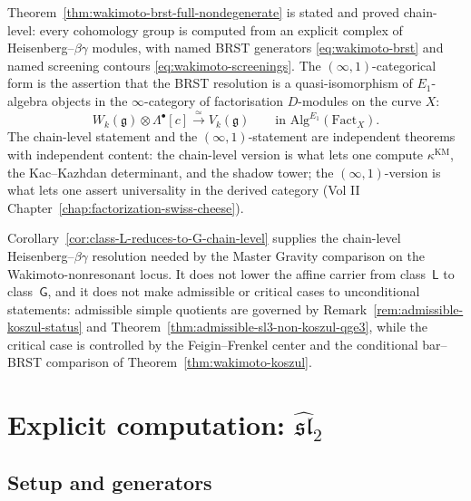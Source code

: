 \begin{remark}
\label{rem:wakimoto-brst-infty-lane}
Theorem~\ref{thm:wakimoto-brst-full-nondegenerate} is stated and
proved chain-level: every cohomology group is computed from an
explicit complex of Heisenberg--$\beta\gamma$ modules, with named
BRST generators
\eqref{eq:wakimoto-brst} and named screening contours
\eqref{eq:wakimoto-screenings}. The $(\infty,1)$-categorical
form is the assertion that the BRST resolution is a
quasi-isomorphism of $E_1$-algebra objects in the
$\infty$-category of factorisation $D$-modules on the curve $X$:
\[
W_k(\mathfrak{g})\otimes\Lambda^\bullet[c]
\xrightarrow{\;\simeq\;}
V_k(\mathfrak{g})
\qquad \text{in } \mathrm{Alg}^{E_1}(\mathrm{Fact}_X).
\]
The chain-level statement and the $(\infty,1)$-statement are
independent theorems with independent content: the chain-level
version is what lets one compute $\kappa^{\mathrm{KM}}$, the
Kac--Kazhdan determinant, and the shadow tower; the
$(\infty,1)$-version is what lets one assert universality in
the derived category (Vol II Chapter~\ref{chap:factorization-swiss-cheese}).
\end{remark}

\begin{remark}
\label{rem:wakimoto-brst-gravity-upgrade}
Corollary~\ref{cor:class-L-reduces-to-G-chain-level} supplies the
chain-level Heisenberg--$\beta\gamma$ resolution needed by the Master
Gravity comparison on the Wakimoto-nonresonant locus. It does not
lower the affine carrier from class~\(\mathsf L\) to
class~\(\mathsf G\), and it does not make admissible or critical
cases to unconditional statements:
admissible simple quotients are governed by
Remark~\ref{rem:admissible-koszul-status} and
Theorem~\ref{thm:admissible-sl3-non-koszul-qge3}, while the critical
case is controlled by the Feigin--Frenkel center and the conditional
bar--BRST comparison of Theorem~\ref{thm:wakimoto-koszul}.
\end{remark}

\section{\texorpdfstring{Explicit computation: $\widehat{\mathfrak{sl}}_2$}{Explicit computation: sl-2}}

\subsection{Setup and generators}

